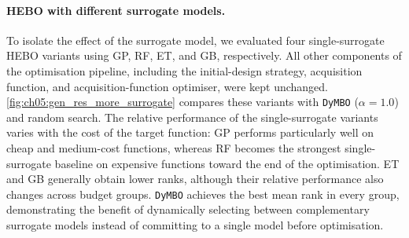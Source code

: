 \paragraph{HEBO with different surrogate models.} To isolate the effect of the surrogate model, we evaluated four single-surrogate HEBO variants using GP, RF, ET, and GB, respectively. All other components of the optimisation pipeline, including the initial-design strategy, acquisition function, and acquisition-function optimiser, were kept unchanged. \cref{fig:ch05:gen_res_more_surrogate} compares these variants with \texttt{DyMBO} ($\alpha=1.0$) and random search. The relative performance of the single-surrogate variants varies with the cost of the target function: GP performs particularly well on cheap and medium-cost functions, whereas RF becomes the strongest single-surrogate baseline on expensive functions toward the end of the optimisation. ET and GB generally obtain lower ranks, although their relative performance also changes across budget groups. \texttt{DyMBO} achieves the best mean rank in every group, demonstrating the benefit of dynamically selecting between complementary surrogate models instead of committing to a single model before optimisation.

